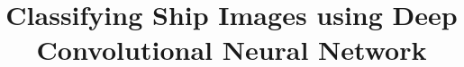 \documentclass{sig-alternate}
\begin{document}
%

\title{Classifying Ship Images using Deep Convolutional Neural Network}
%
%
%
%
%
\end{document}
